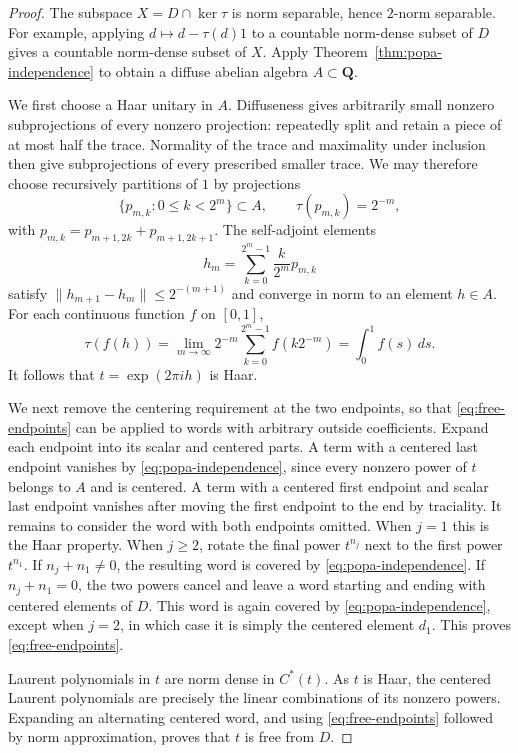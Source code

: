\begin{proof}
The subspace $X=D\cap\ker\tau$ is norm separable, hence $2$-norm
separable.  For example, applying $d\mapsto d-\tau(d)1$ to a
countable norm-dense subset of $D$ gives a countable norm-dense
subset of $X$.  Apply Theorem~\ref{thm:popa-independence} to obtain
a diffuse abelian algebra $A\subset\mathbf Q$.

We first choose a Haar unitary in $A$.  Diffuseness gives arbitrarily
small nonzero subprojections of every nonzero projection: repeatedly
split and retain a piece of at most half the trace.  Normality of the
trace and maximality under inclusion then give subprojections of every
prescribed smaller trace.  We may therefore choose recursively
partitions of $1$ by projections
\[
  \{p_{m,k}:0\leq k<2^m\}\subset A,
  \qquad \tau(p_{m,k})=2^{-m},
\]
with $p_{m,k}=p_{m+1,2k}+p_{m+1,2k+1}$.  The self-adjoint
elements
\[
  h_m=\sum_{k=0}^{2^m-1}\frac{k}{2^m}p_{m,k}
\]
satisfy $\|h_{m+1}-h_m\|\leq2^{-(m+1)}$ and converge in norm to
an element $h\in A$.  For each continuous function $f$ on $[0,1]$,
\[
  \tau(f(h))
  =\lim_{m\to\infty}2^{-m}
        \sum_{k=0}^{2^m-1}f(k2^{-m})
  =\int_0^1 f(s)\,ds.
\]
It follows that $t=\exp(2\pi i h)$ is Haar.

We next remove the centering requirement at the two endpoints, so
that \eqref{eq:free-endpoints} can be applied to words with arbitrary
outside coefficients.  Expand each endpoint into its scalar and
centered parts.  A term with a centered last endpoint
vanishes by \eqref{eq:popa-independence}, since every nonzero power
of $t$ belongs to $A$ and is centered.  A term with a centered first
endpoint and scalar last endpoint vanishes after moving the first
endpoint to the end by traciality.  It remains to consider the word
with both endpoints omitted.  When $j=1$ this is the Haar property.
When $j\geq2$, rotate the final power $t^{n_j}$ next to the first
power $t^{n_1}$.  If $n_j+n_1\ne0$, the resulting word is covered
by \eqref{eq:popa-independence}.  If $n_j+n_1=0$, the two powers
cancel and leave a word starting and ending with centered elements
of $D$.  This word is again covered by
\eqref{eq:popa-independence}, except when $j=2$, in which case it
is simply the centered element $d_1$.  This proves
\eqref{eq:free-endpoints}.

Laurent polynomials in $t$ are norm dense in $C^*(t)$.  As $t$ is
Haar, the centered Laurent polynomials are precisely the linear
combinations of its nonzero powers.  Expanding an alternating
centered word, and using \eqref{eq:free-endpoints} followed by norm
approximation, proves that $t$ is free from $D$.
\end{proof}


